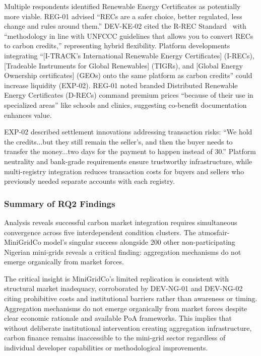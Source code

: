 Multiple respondents identified Renewable Energy Certificates as potentially more viable. REG-01 advised ``RECs are a safer choice, better regulated, less change and rules around them.'' DEV-KE-02 cited the R-REC Standard~\cite{rrecs} with ``methodology in line with UNFCCC guidelines that allows you to convert RECs to carbon credits,'' representing hybrid flexibility. Platform developments integrating ``[I-TRACK's International Renewable Energy Certificates] (I-RECs), [Tradeable Instruments for Global Renewables] (TIGRs), and [Global Energy Ownership certificates] (GEOs) onto the same platform as carbon credits'' could increase liquidity (EXP-02). REG-01 noted branded Distributed Renewable Energy Certificates (D-RECs) command premium prices ``because of their use in specialized areas'' like schools and clinics, suggesting co-benefit documentation enhances value.

EXP-02 described settlement innovations addressing transaction risks: ``We hold the credits...but they still remain the seller's, and then the buyer needs to transfer the money...two days for the payment to happen instead of 30.'' Platform neutrality and bank-grade requirements ensure trustworthy infrastructure, while multi-registry integration reduces transaction costs for buyers and sellers who previously needed separate accounts with each registry.

\subsubsection{Summary of RQ2 Findings}
Analysis reveals successful carbon market integration requires simultaneous convergence across five interdependent condition clusters. The atmosfair-MiniGridCo model's singular success alongside 200 other non-participating Nigerian mini-grids reveals a critical finding: aggregation mechanisms do not emerge organically from market forces.

The critical insight is MiniGridCo's limited replication is consistent with structural market inadequacy, corroborated by DEV-NG-01 and DEV-NG-02 citing prohibitive costs and institutional barriers rather than awareness or timing. Aggregation mechanisms do not emerge organically from market forces despite clear economic rationale and available PoA frameworks. This implies that without deliberate institutional intervention creating aggregation infrastructure, carbon finance remains inaccessible to the mini-grid sector regardless of individual developer capabilities or methodological improvements.


